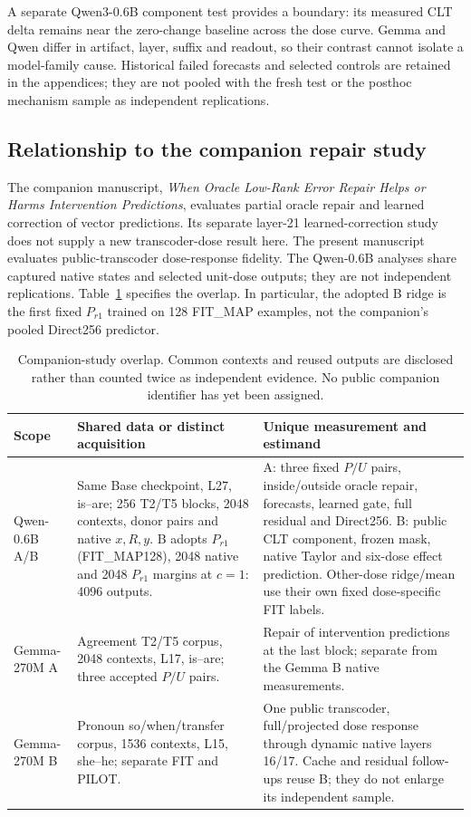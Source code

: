 A separate Qwen3-0.6B component test provides a boundary: its measured CLT delta remains near the zero-change baseline across the dose curve. Gemma and Qwen differ in artifact, layer, suffix and readout, so their contrast cannot isolate a model-family cause. Historical failed forecasts and selected controls are retained in the appendices; they are not pooled with the fresh test or the posthoc mechanism sample as independent replications.
\subsection*{Relationship to the companion repair study}
The companion manuscript, \emph{When Oracle Low-Rank Error Repair Helps or Harms Intervention Predictions}, evaluates partial oracle repair and learned correction of vector predictions. Its separate layer-21 learned-correction study does not supply a new transcoder-dose result here. The present manuscript evaluates public-transcoder dose-response fidelity. The Qwen-0.6B analyses share captured native states and selected unit-dose outputs; they are not independent replications. Table~\ref{tab:shared} specifies the overlap. In particular, the adopted B ridge is the first fixed $P_{r1}$ trained on 128 FIT\_MAP examples, not the companion's pooled Direct256 predictor.
\begin{table}[ht]\centering\scriptsize
\setlength{\tabcolsep}{4pt}
\begin{tabular}{>{\raggedright\arraybackslash}p{}>{\raggedright\arraybackslash}p{}>{\raggedright\arraybackslash}p{}}\toprule
Scope & Shared data or distinct acquisition & Unique measurement and estimand\\\midrule
Qwen-0.6B A/B & Same Base checkpoint, L27, is--are; 256 T2/T5 blocks, 2048 contexts, donor pairs and native $x,R,y$. B adopts $P_{r1}$ (FIT\_MAP128), 2048 native and 2048 $P_{r1}$ margins at $c=1$: 4096 outputs. & A: three fixed $P/U$ pairs, inside/outside oracle repair, forecasts, learned gate, full residual and Direct256. B: public CLT component, frozen mask, native Taylor and six-dose effect prediction. Other-dose ridge/mean use their own fixed dose-specific FIT labels.\\[3pt]
Gemma-270M A & Agreement T2/T5 corpus, 2048 contexts, L17, is--are; three accepted $P/U$ pairs. & Repair of intervention predictions at the last block; separate from the Gemma B native measurements.\\[3pt]
Gemma-270M B & Pronoun so/when/transfer corpus, 1536 contexts, L15, she--he; separate FIT and PILOT. & One public transcoder, full/projected dose response through dynamic native layers 16/17. Cache and residual follow-ups reuse B; they do not enlarge its independent sample.\\\bottomrule
\end{tabular}
\caption{Companion-study overlap. Common contexts and reused outputs are disclosed rather than counted twice as independent evidence. No public companion identifier has yet been assigned.}\label{tab:shared}
\end{table}

